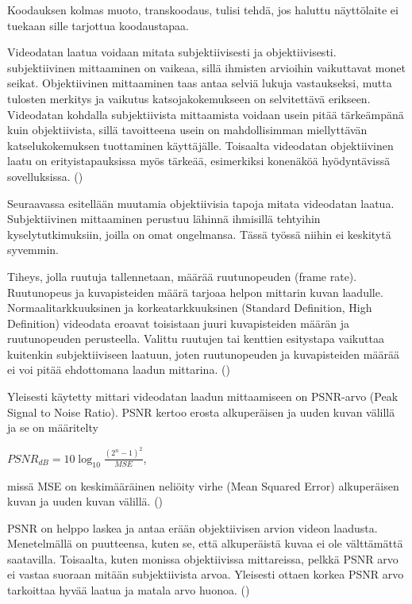 Koodauksen kolmas muoto, transkoodaus, tulisi tehdä, jos haluttu näyttölaite ei
tuekaan sille tarjottua koodaustapaa.

Videodatan laatua voidaan mitata subjektiivisesti ja objektiivisesti.
subjektiivinen mittaaminen on vaikeaa, sillä ihmisten arvioihin vaikuttavat
monet seikat. Objektiivinen mittaaminen taas antaa selviä lukuja vastaukseksi,
mutta tulosten merkitys ja vaikutus katsojakokemukseen on selvitettävä erikseen.
Videodatan kohdalla subjektiivista mittaamista voidaan usein pitää tärkeämpänä
kuin objektiivista, sillä tavoitteena usein on mahdollisimman miellyttävän
katselukokemuksen tuottaminen käyttäjälle. Toisaalta videodatan objektiivinen
laatu on erityistapauksissa myös tärkeää, esimerkiksi konenäköä hyödyntävissä
sovelluksissa. (\cite{h264})

Seuraavassa esitellään muutamia objektiivisia tapoja mitata videodatan laatua.
Subjektiivinen mittaaminen perustuu lähinnä ihmisillä tehtyihin
kyselytutkimuksiin, joilla on omat ongelmansa. Tässä työssä niihin ei keskitytä
syvemmin.

Tiheys, jolla ruutuja tallennetaan, määrää ruutunopeuden (frame rate).
Ruutunopeus ja kuvapisteiden määrä tarjoaa helpon mittarin kuvan laadulle.
Normaalitarkkuuksinen ja korkeatarkkuuksinen (Standard Definition, High
Definition) videodata eroavat toisistaan juuri kuvapisteiden määrän ja
ruutunopeuden perusteella. Valittu ruutujen tai kenttien esitystapa vaikuttaa
kuitenkin subjektiiviseen laatuun, joten ruutunopeuden ja kuvapisteiden määrää
ei voi pitää ehdottomana laadun mittarina. (\cite{h264})

Yleisesti käytetty mittari videodatan laadun mittaamiseen on PSNR-arvo (Peak
Signal to Noise Ratio). PSNR kertoo erosta alkuperäisen ja uuden kuvan välillä
ja se on määritelty

\begin{center}
$PSNR_{dB} = 10\log_{10}\frac{(2^n - 1)^2}{MSE}$,
\end{center}

missä MSE on keskimääräinen neliöity virhe (Mean Squared Error) alkuperäisen 
kuvan ja uuden kuvan välillä. (\cite{h264})

PSNR on helppo laskea ja antaa erään objektiivisen arvion videon laadusta.
Menetelmällä on puutteensa, kuten se, että alkuperäistä kuvaa ei ole
välttämättä saatavilla. Toisaalta, kuten monissa objektiivissa mittareissa,
pelkkä PSNR arvo ei vastaa suoraan mitään subjektiivista arvoa. Yleisesti
ottaen korkea PSNR arvo tarkoittaa hyvää laatua ja matala arvo huonoa.
(\cite{h264})

